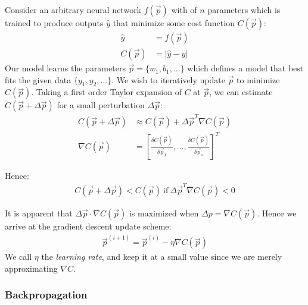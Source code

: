 \documentclass[paper=a4, fontsize=12pt]{scrartcl} %
\numberwithin{equation}{section} %
\numberwithin{figure}{section} %
\numberwithin{table}{section} %
\begin{document}
Consider an arbitrary neural network $f(\vec{p})$ with of $n$ parameters which is trained to produce outputs $\hat{y}$ that minimize some cost function $C(\vec{p})$:
\begin{align*}
    \hat{y} &= f(\vec{p}) \\
    C(\vec{p}) &= | \hat{y} - y |
\end{align*}
Our model learns the parameters $\vec{p} = \{ w_1, b_1, \ldots \}$ which defines a model that best fits the given data $\{ y_1, y_2, \ldots \}$. We wish to iteratively update $\vec{p}$
to minimize $C(\vec{p})$. Taking a first order Taylor expansion of $C$ at $\vec{p}$, we can estimate $C(\vec{p} + \Delta \vec{p})$ for a small perturbation $\Delta \vec{p}$:
\begin{align*}
    C(\vec{p} + \Delta \vec{p}) &\approx C(\vec{p}) +  \Delta \vec{p}^T \nabla C(\vec{p}) \\
    \nabla C(\vec{p}) &= \left[ \frac{\delta C(\vec{p})}{\delta \vec{p}_1}, ..., \frac{\delta C(\vec{p})}{\delta \vec{p}_s} \right]^T
\end{align*}

Hence:
\begin{align*}
    C(\vec{p} + \Delta \vec{p}) < C(\vec{p}) \mathrm{\ if\ } \Delta \vec{p}^T \nabla C(\vec{p}) < 0
\end{align*}

It is apparent that $\Delta \vec{p} \cdot \nabla C(\vec{p})$ is maximized when $\Delta p = \nabla C(\vec{p})$. Hence we arrive at the 
gradient descent update scheme:
\begin{align*}
    \vec{p}^{(i+1)} = \vec{p}^{(i)} - \eta \nabla C(\vec{p})
\end{align*}
We call $\eta$ the \textit{learning rate}, and keep it at a small value since we are merely approximating $\nabla C$.

\pagebreak

\subsubsection{Backpropagation}
\end{document}
